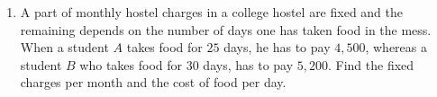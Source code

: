 \begin{enumerate}
\item A part of monthly hostel charges in a college hostel are fixed and the remaining depends on the number of days one has taken food in the mess. When a student $A$ takes food for $25$ days, he has to pay {\rupee $4,500$}, whereas a student $B$ who takes food for $30$ days, has to pay {\rupee $5,200$}. Find the fixed charges per month and the cost of food per day.



\end{enumerate}

